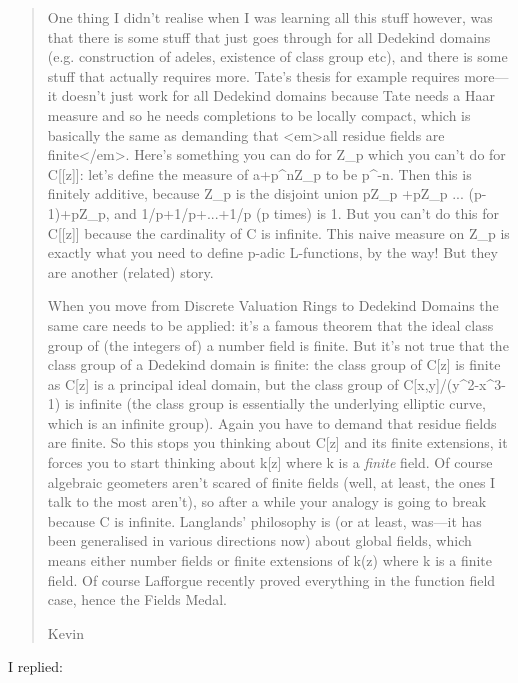 \begin{quote}
 One thing I didn't realise when I was learning all this stuff however, was
 that there is some stuff that just goes through for all Dedekind domains
 (e.g. construction of adeles, existence of class group etc), and there is
 some stuff that actually requires more. Tate's thesis for example requires
 more---it doesn't just work for all Dedekind domains because Tate needs a
 Haar measure and so he needs completions to be locally compact,
 which is basically the same as demanding that <em>all residue fields are
 finite</em>.  Here's something you can do for Z_{p} 
 which you can't do for
 C[[z]]: let's define the measure of a+p^{n}Z_{p} 
 to be p^{-n}. Then this is
 finitely additive, because Z_{p} 
 is the disjoint union pZ_{p} +pZ_{p} \cup 
 ... \cup  (p-1)+pZ_{p}, and 
 1/p+1/p+...+1/p (p times) is 1.
 But you can't do this for C[[z]] because the cardinality of 
 C is infinite.  This naive
 measure on Z_{p} is exactly what you need to define p-adic 
 L-functions, 
 by the way! But they are another (related) story.

 When you move from Discrete Valuation Rings to Dedekind Domains the same
 care needs to be applied: it's a famous theorem that the ideal class group 
 of (the integers of) a number field is finite.  But it's not true that the
 class group of a Dedekind domain is finite: the class group of C[z] is
 finite as C[z] is a principal ideal domain, but the class group of
 C[x,y]/(y^{2}-x^{3}-1) is infinite (the class group is essentially the
 underlying elliptic curve, which is an infinite group).  Again you have to
 demand that residue fields are finite.  So this stops you thinking about
 C[z] and its finite extensions, it forces you to start thinking about k[z]
 where k is a \emph{finite} field.  
  Of course algebraic geometers aren't scared
 of finite fields (well, at least, the ones I talk to the most aren't), so
 after a while your analogy is going to break because C is infinite.
 Langlands' philosophy is (or at least, was---it has been generalised in
 various directions now) about global fields, which means either number
 fields or finite extensions of k(z) where k is a finite field.  Of course
 Lafforgue recently proved everything in the function field case, hence the
 Fields Medal.
 
 Kevin
\end{quote}

I replied:

